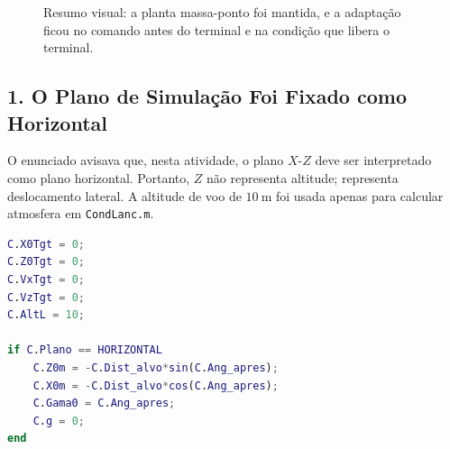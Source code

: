 \begin{figure}[H]
\centering
{}
\caption{Resumo visual: a planta massa-ponto foi mantida, e a adapta\c{c}\~ao ficou no comando antes do terminal e na condi\c{c}\~ao que libera o terminal.}
\end{figure}

\subsection{1. O Plano de Simula\c{c}\~ao Foi Fixado como Horizontal}

O enunciado avisava que, nesta atividade, o plano \(X\)-\(Z\) deve ser interpretado como plano horizontal. Portanto, \(Z\) n\~ao representa altitude; representa deslocamento lateral. A altitude de voo de \(10~\text{m}\) foi usada apenas para calcular atmosfera em \texttt{CondLanc.m}.

\begin{lstlisting}[language=Matlab]
C.X0Tgt = 0;
C.Z0Tgt = 0;
C.VxTgt = 0;
C.VzTgt = 0;
C.AltL = 10;

if C.Plano == HORIZONTAL
    C.Z0m = -C.Dist_alvo*sin(C.Ang_apres);
    C.X0m = -C.Dist_alvo*cos(C.Ang_apres);
    C.Gama0 = C.Ang_apres;
    C.g = 0;
end
\end{lstlisting}

